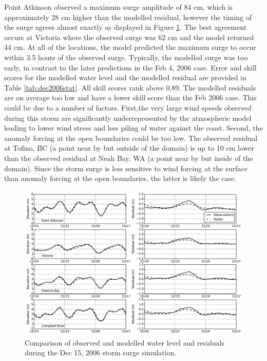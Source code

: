 \documentclass[pdftex,10pt]{article}
\begin{document}
Point Atkinson observed a maximum surge amplitude of 84 cm, which is approximately 28 cm higher than the modelled residual, however the timing of the surge agrees almost exactly as displayed in Figure \ref{fig:dec2006}. The best agreement occurs at Victoria where the observed surge was 62 cm and the model returned 44 cm. At all of the locations, the model predicted the maximum surge to occur within 3.5 hours of the observed surge. Typically, the modelled surge was too early, in contrast to the later predictions in the Feb 4, 2006 case. Error and skill scores for the modelled water level and the modelled residual are provided in Table \ref{tab:dec2006stat}. All skill scores rank above 0.89. The modelled residuals are on average too low and have a lower skill score than the Feb 2006 case. This could be due to a number of factors. First,the very large wind speeds observed during this storm are significantly underrepresented by the atmospheric model leading to lower wind stress and less piling of water against the coast. Second, the anomaly forcing at the open boundaries could be too low. The observed residual at Tofino, BC (a point near by but outside of the domain) is up to 10 cm lower than the observed residual at Neah Bay, WA (a point near by but inside of the domain). Since the storm surge is less sensitive to wind forcing at the surface than anomaly forcing at the open boundaries, the latter is likely the case. 

\begin{figure}
\centering
\includegraphics[scale=0.6]{Figures/dec2006.pdf}
\caption{Comparison of observed and modelled water level and residuals during the Dec 15, 2006 storm surge simulation. }
\label{fig:dec2006}
\end{figure}%
\end{document}
